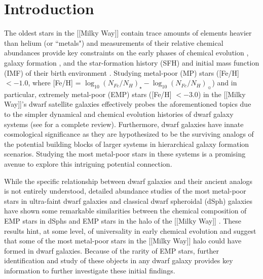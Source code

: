 \documentclass{emulateapj-rtx4}
\begin{document}
\section{Introduction}
\label{sec:introduction}

The oldest stars in the [[Milky Way]] contain trace amounts of elements heavier than helium (or ``metals")
and measurements of their relative chemical abundances provide key constraints on the early phases of
chemical evolution \citep[e.g.][]{m+97, kcm+11}, galaxy formation \citep[e.g.][]{kb+02},
and the star-formation history (SFH) and initial mass function (IMF)
of their birth environment \citep[e.g.][]{bl+04}.
Studying metal-poor (MP) stars ([Fe/H] $< -1.0$, where [Fe/H] = $\log_{10}(N_{Fe}/N_H)_{\star} 
- \log_{10}(N_{Fe}/N_H)_\sun$) and in particular, extremely metal-poor (EMP)
stars ([Fe/H] $< -3.0$) in the [[Milky Way]]'s dwarf satellite galaxies
effectively probes the aforementioned topics due to
the simpler dynamical and chemical evolution histories of dwarf galaxy systems
(see \citealt{tht+09} for a complete review).
Furthermore, dwarf galaxies have innate cosmological significance as they are hypothesized 
to be the surviving analogs of the potential building blocks of larger systems in hierarchical galaxy 
formation scenarios. Studying the most metal-poor stars in these systems
is a promising avenue to explore this intriguing potential connection.

While the specific relationship between dwarf galaxies and their ancient analogs
is not entirely understood, detailed abundance studies of the most metal-poor stars in
ultra-faint dwarf galaxies and classical dwarf spheroidal (dSph) galaxies
have shown some remarkable similarities between the chemical composition of EMP stars in dSphs 
and EMP stars in the halo of the [[Milky Way]] \citep{ch+09, ch+10,
kgb+09,fks+10,fsg+10, sfm+10, tjh+10, ngw+10, nyg+10, 
llb+11, gnm+13, fsk+14, kr+14, rk+14, sjf+15, jnm+15, jfs+16}. These results hint, at some level, of universality
in early chemical evolution and suggest that some of the
most metal-poor stars in
the [[Milky Way]] halo could have formed in dwarf galaxies. Because of the rarity of EMP stars, further identification and study of
these objects in any dwarf galaxy provides key information to further investigate these initial findings.
\end{document}
